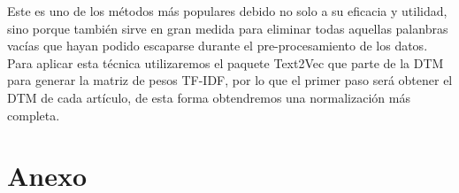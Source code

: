 \documentclass[10pt, a4paper]{article}
\begin{document}
Este es uno de los métodos más populares debido no solo a su eficacia y utilidad, sino porque también sirve en gran medida para eliminar todas aquellas palanbras vacías que hayan podido escaparse durante el pre-procesamiento de los datos. Para aplicar esta técnica utilizaremos el paquete Text2Vec que parte de la DTM para generar la matriz de pesos TF-IDF, por lo que el primer paso será obtener el DTM de cada artículo, de esta forma obtendremos una normalización más completa.








\clearpage

\section{Anexo}

\renewcommand{\listalgorithmcfname}{\subsection{\textbf{Algoritmos}}}
\listofalgorithms

\renewcommand{\listtablename}{\subsection{\textbf{Tablas}}}
\listoftables

\renewcommand{\listfigurename}{\subsection{\textbf{Imágenes y figuras}}}
\listoffigures

\clearpage
\end{document}
